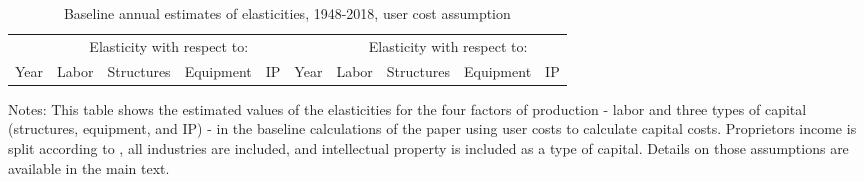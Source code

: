 \documentclass[11pt]{article}
\begin{document}
\begin{table}[!htb]
\begin{center}
\label{TAB_annual_usercost}
\caption{Baseline annual estimates of elasticities, 1948-2018, user cost assumption}
{\footnotesize
\begin{tabularx}{\textwidth}{XXXXXXXXXX}
\midrule
& \multicolumn{4}{c}{Elasticity with respect to:} & & \multicolumn{4}{c}{Elasticity with respect to:} \\ \cmidrule(lr){2-5} \cmidrule(lr){7-10}
Year  & Labor  & Structures & Equipment & IP & Year  & Labor  & Structures & Equipment & IP \\ 
\midrule

\midrule
\end{tabularx}
}
\end{center}
{\footnotesize Notes: This table shows the estimated values of the elasticities for the four factors of production - labor and three types of capital (structures, equipment, and IP) - in the baseline calculations of the paper using user costs to calculate capital costs. Proprietors income is split according to \cite{gommerupert2004}, all industries are included, and intellectual property is included as a type of capital. Details on those assumptions are available in the main text.}
\end{table}
\end{document}
